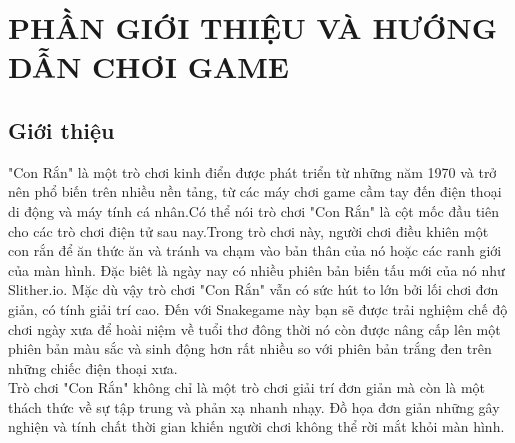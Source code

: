 \documentclass[article]{llncs}
\begin{document}
\newpage

\section{PHẦN GIỚI THIỆU VÀ HƯỚNG DẪN CHƠI GAME}
\subsection{Giới thiệu}
    "Con Rắn" là một trò chơi kinh điển được phát triển từ những năm 1970 và trở nên phổ biến trên nhiều nền tảng, từ các máy chơi game cầm tay đến điện thoại di động và máy tính cá nhân.Có thể nói trò chơi "Con Rắn" là cột mốc đầu tiên cho các trò chơi điện tử sau nay.Trong trò chơi này, người chơi điều khiên một con rắn để ăn thức ăn và tránh va chạm vào bản thân của nó hoặc các ranh giới của màn hình. Đặc biêt là ngày nay có nhiều phiên bản biến tấu mới của nó như Slither.io. Mặc dù vậy trò chơi "Con Rắn" vẫn có sức hút to lớn bởi lối chơi đơn giản, có tính giải trí cao. Đến với Snakegame này bạn sẽ được trải nghiệm chế độ chơi ngày xưa để hoài niệm về tuổi thơ đông thời nó còn được nâng cấp lên một phiên bản màu sắc và sinh động hơn rất nhiều so với phiên bản trắng đen trên những chiếc điện thoại xưa.\\
    Trò chơi "Con Rắn" không chỉ là một trò chơi giải trí đơn giản mà còn là một thách thức về sự tập trung và phản xạ nhanh nhạy. Đồ họa đơn giản những gây nghiện và tính chất thời gian khiến người chơi không thể rời mắt khỏi màn hình.
\end{document}

